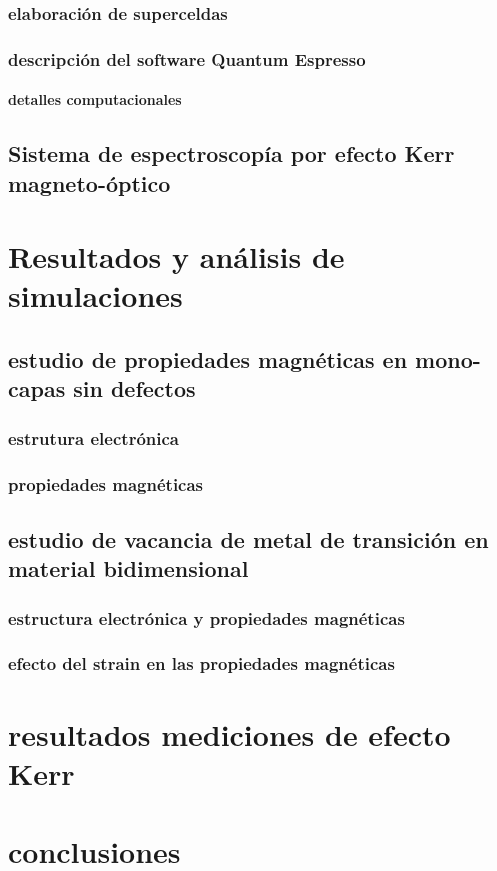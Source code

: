 \documentclass[12pt,a4paper]{book}
\begin{document}
	\subsection{elaboraci\'on de superceldas}
	\subsection{descripción del software Quantum Espresso}
	\subsubsection{detalles computacionales}
	\section{Sistema de espectroscop\'ia por efecto Kerr magneto-\'optico}
	
	\chapter{Resultados  y an\'alisis de simulaciones }
	\section{estudio de propiedades magn\'eticas en mono-capas sin defectos }
	\subsection{estrutura electr\'onica}
	\subsection{propiedades magn\'eticas}
	\section{estudio de vacancia de metal de transici\'on en material bidimensional}
	\subsection{estructura electrónica y propiedades magn\'eticas}
	\subsection{efecto del strain en las propiedades magn\'eticas}
	
	\chapter{resultados mediciones de efecto Kerr}
	
	\chapter{conclusiones}
	
\end{document}
